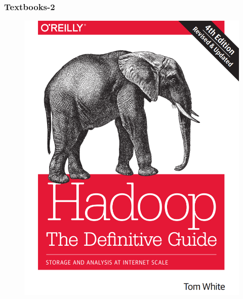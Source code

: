 \begin{frame}
\frametitle{Textbooks-2}
\begin{figure}[ht]
	\begin{minipage}[c][1\width]{
				0.4\textwidth}
			\centering
		\includegraphics[width=\linewidth]{./Figures/chapter-00/hadoop-tdg.png}
	\end{minipage}
	\hfill 	
	\begin{minipage}[c][1\width]{
				0.4\textwidth}
			\centering

\end{minipage}
\end{figure}
\end{frame}
